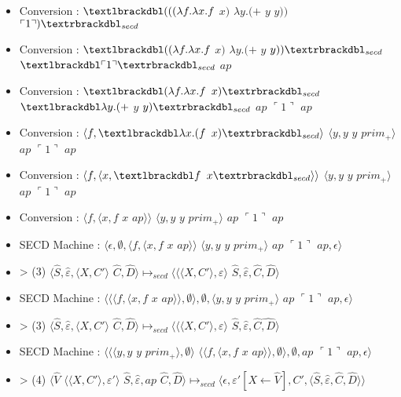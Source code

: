 \documentclass[10pt,a4paper]{report}
\begin{document}
\begin{itemize}
\item[] Conversion : $\textlbrackdbl(((\lambda f.\lambda x.f$ $x)$ $\lambda y.(+$ $y$ $y))$ $\ulcorner 1\urcorner)\textrbrackdbl_{secd}$
\item[] Conversion : $\textlbrackdbl((\lambda f.\lambda x.f$ $x)$ $\lambda y.(+$ $y$ $y))\textrbrackdbl_{secd}$ $\textlbrackdbl\ulcorner 1\urcorner\textrbrackdbl_{secd}$ $ap$
\item[] Conversion : $\textlbrackdbl(\lambda f.\lambda x.f$ $x)\textrbrackdbl_{secd}$ $\textlbrackdbl\lambda y.(+$ $y$ $y)\textrbrackdbl_{secd}$ $ap$ $\ulcorner 1\urcorner$ $ap$
\item[] Conversion : $\langle f,\textlbrackdbl\lambda x.(f$ $x)\textrbrackdbl_{secd}\rangle$ $\langle y,y$ $y$ $prim_{+}\rangle$ $ap$ $\ulcorner 1\urcorner$ $ap$
\item[] Conversion : $\langle f,\langle x,\textlbrackdbl f$ $x\textrbrackdbl_{secd}\rangle\rangle$ $\langle y,y$ $y$ $prim_{+}\rangle$ $ap$ $\ulcorner 1\urcorner$ $ap$
\item[] Conversion : $\langle f,\langle x,f$ $x$ $ap\rangle\rangle$ $\langle y,y$ $y$ $prim_{+}\rangle$ $ap$ $\ulcorner 1\urcorner$ $ap$
\item[] SECD Machine : $\langle\epsilon,\emptyset,\langle f,\langle x,f$ $x$ $ap\rangle\rangle$ $\langle y,y$ $y$ $prim_{+}\rangle$ $ap$ $\ulcorner 1\urcorner$ $ap,\epsilon\rangle$ 
\item[] > (3) $\langle\widehat{S},\widehat{\varepsilon},\langle X,C'\rangle$ $\widehat{C},\widehat{D}\rangle \longmapsto_{secd} \langle\langle\langle X,C'\rangle,\varepsilon\rangle$ $\widehat{S},\widehat{\varepsilon},\widehat{C},\widehat{D}\rangle$
\item[] SECD Machine : $\langle\langle\langle f,\langle x,f$ $x$ $ap\rangle\rangle,\emptyset\rangle,\emptyset,\langle y,y$ $y$ $prim_{+}\rangle$ $ap$ $\ulcorner 1\urcorner$ $ap,\epsilon\rangle$ 
\item[] > (3) $\langle\widehat{S},\widehat{\varepsilon},\langle X,C'\rangle$ $\widehat{C},\widehat{D}\rangle \longmapsto_{secd} \langle\langle\langle X,C'\rangle,\varepsilon\rangle$ $\widehat{S},\widehat{\varepsilon},\widehat{C}\widehat{,D}\rangle$
\item[] SECD Machine : $\langle\langle\langle y,y$ $y$ $prim_{+}\rangle,\emptyset\rangle$ $\langle\langle f,\langle x,f$ $x$ $ap\rangle\rangle,\emptyset\rangle,\emptyset,ap$ $\ulcorner 1\urcorner$ $ap,\epsilon\rangle$
\item[] > (4) $\langle\widehat{V}$ $\langle\langle X,C'\rangle,\varepsilon'\rangle$ $\widehat{S},\widehat{\varepsilon},ap$ $\widehat{C},\widehat{D}\rangle \longmapsto_{secd} \langle\epsilon,\varepsilon'[X \leftarrow \widehat{V}],C',\langle\widehat{S},\widehat{\varepsilon},\widehat{C},\widehat{D}\rangle\rangle$

\end{itemize}
\end{document}
